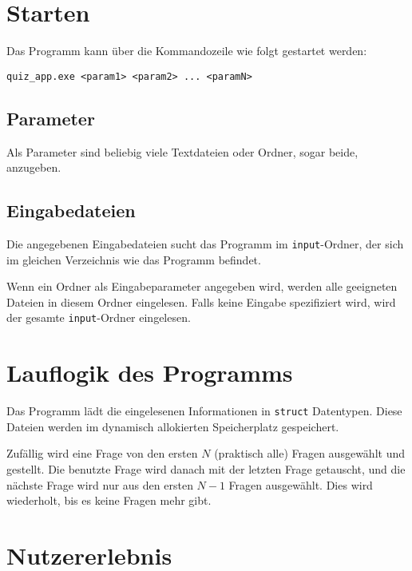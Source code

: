 \documentclass{article}
\begin{document}
\section{Starten}
Das Programm kann über die Kommandozeile wie folgt gestartet werden:

\begin{lstlisting}
quiz_app.exe <param1> <param2> ... <paramN>
\end{lstlisting}

\subsection{Parameter}
Als Parameter sind beliebig viele Textdateien oder Ordner, sogar beide, anzugeben.

\subsection{Eingabedateien}
Die angegebenen Eingabedateien sucht das Programm im \texttt{input}-Ordner, der sich im gleichen Verzeichnis wie das Programm befindet.

Wenn ein Ordner als Eingabeparameter angegeben wird, werden alle geeigneten Dateien in diesem Ordner eingelesen.
Falls keine Eingabe spezifiziert wird, wird der gesamte \texttt{input}-Ordner eingelesen.


\section{Lauflogik des Programms}
Das Programm lädt die eingelesenen Informationen in \texttt{struct} Datentypen. Diese Dateien werden im dynamisch allokierten Speicherplatz gespeichert.

Zufällig wird eine Frage von den ersten \(N\) (praktisch alle) Fragen ausgewählt und gestellt. Die benutzte Frage wird danach mit der letzten Frage getauscht, und die nächste Frage wird nur aus den ersten \(N-1\) Fragen ausgewählt. Dies wird wiederholt, bis es keine Fragen mehr gibt.

\section{Nutzererlebnis}
\end{document}
